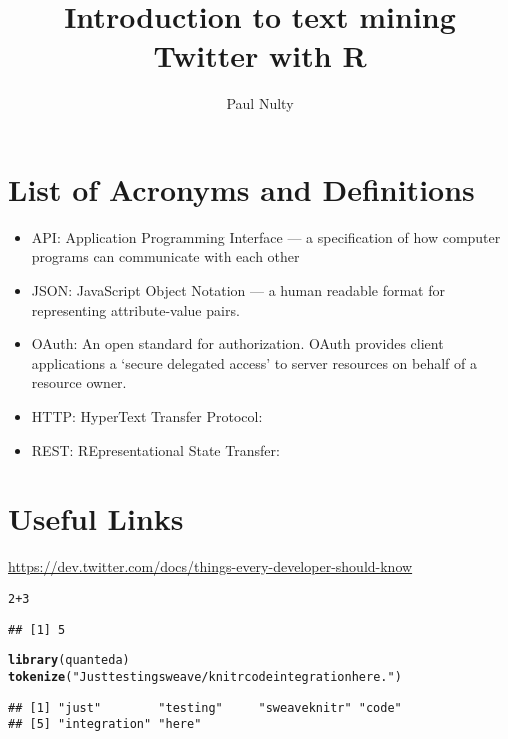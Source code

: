 \documentclass{article}\usepackage[]{graphicx}\usepackage[]{color}
\title{Introduction to text mining Twitter with R}
\author{Paul Nulty}
\makeatletter
\newcommand{\hlnum}[1]{\textcolor[rgb]{0.686,0.059,0.569}{#1}}%
\newcommand{\hlstr}[1]{\textcolor[rgb]{0.192,0.494,0.8}{#1}}%
\newcommand{\hlopt}[1]{\textcolor[rgb]{0,0,0}{#1}}%
\newcommand{\hlstd}[1]{\textcolor[rgb]{0.345,0.345,0.345}{#1}}%
\newcommand{\hlkwd}[1]{\textcolor[rgb]{0.737,0.353,0.396}{\textbf{#1}}}%
\newenvironment{kframe}{%
 \def\at@end@of@kframe{}%
 \ifinner\ifhmode%
  \def\at@end@of@kframe{\end{minipage}}%
  \begin{minipage}{\columnwidth}%
 \fi\fi%
 \def\FrameCommand##1{\hskip\@totalleftmargin \hskip-\fboxsep
 \colorbox{shadecolor}{##1}\hskip-\fboxsep
     \hskip-\linewidth \hskip-\@totalleftmargin \hskip\columnwidth}%
 \MakeFramed {\advance\hsize-\width
   \@totalleftmargin\z@ \linewidth\hsize
   \@setminipage}}%
 {\par\unskip\endMakeFramed%
 \at@end@of@kframe}
\newenvironment{knitrout}{}{} %
\makeatother
\begin{document}
\maketitle
\clearpage

\section*{List of Acronyms and Definitions}
\begin{itemize}
  \item API: Application Programming Interface --- a specification of how computer programs can communicate with each other
  \item JSON: JavaScript Object Notation --- a human readable format for representing attribute-value pairs.
  \item OAuth: An open standard for authorization. OAuth provides client applications a `secure delegated access' to server resources on behalf of a resource owner.
  \item HTTP: HyperText Transfer Protocol: 
  \item REST: REpresentational State Transfer:
\end{itemize}

\section*{Useful Links}
\url{https://dev.twitter.com/docs/things-every-developer-should-know}

\clearpage


\begin{knitrout}
\color{fgcolor}\begin{kframe}
\begin{alltt}
\hlnum{2} \hlopt{+} \hlnum{3}
\end{alltt}
\begin{verbatim}
## [1] 5
\end{verbatim}
\begin{alltt}
\hlkwd{library}\hlstd{(quanteda)}
\hlkwd{tokenize}\hlstd{(}\hlstr{"Just testing sweave/knitr code integration here."}\hlstd{)}
\end{alltt}
\begin{verbatim}
## [1] "just"        "testing"     "sweaveknitr" "code"       
## [5] "integration" "here"
\end{verbatim}
\end{kframe}
\end{knitrout}
\end{document}
